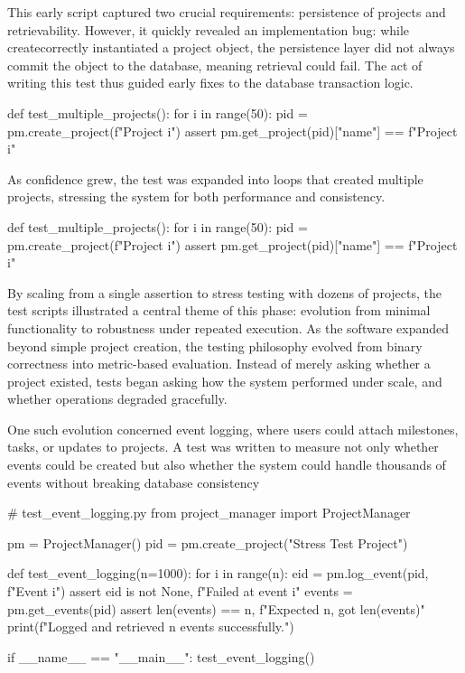 \documentclass{report}
\begin{document}
This early script captured two crucial requirements: persistence of projects and retrievability. 
However, it quickly revealed an implementation bug: while create\textunderscoreproject correctly instantiated a project object, the persistence layer did not always commit the object to the database, meaning retrieval could fail. 
The act of writing this test thus guided early fixes to the database transaction logic.

\begin{python}
    def test_multiple_projects():
    for i in range(50):
        pid = pm.create_project(f"Project {i}")
        assert pm.get_project(pid)["name"] == f"Project {i}"

\end{python} 

As confidence grew, the test was expanded into loops that created multiple projects, stressing the system for both performance and consistency.

\begin{python}
def test_multiple_projects():
    for i in range(50):
        pid = pm.create_project(f"Project {i}")
        assert pm.get_project(pid)["name"] == f"Project {i}"
\end{python}    

By scaling from a single assertion to stress testing with dozens of projects, the test scripts illustrated a central theme of this phase: evolution from minimal functionality to robustness under repeated execution.
As the software expanded beyond simple project creation, the testing philosophy evolved from binary correctness into metric-based evaluation. 
Instead of merely asking whether a project existed, tests began asking how the system performed under scale, and whether operations degraded gracefully.

One such evolution concerned event logging, where users could attach milestones, tasks, or updates to projects. 
A test was written to measure not only whether events could be created but also whether the system could handle thousands of events without breaking database consistency

\begin{python}
# test_event_logging.py
from project_manager import ProjectManager

pm = ProjectManager()
pid = pm.create_project("Stress Test Project")

def test_event_logging(n=1000):
    for i in range(n):
        eid = pm.log_event(pid, f"Event {i}")
        assert eid is not None, f"Failed at event {i}"
    events = pm.get_events(pid)
    assert len(events) == n, f"Expected {n}, got {len(events)}"
    print(f"Logged and retrieved {n} events successfully.")

if __name__ == "__main__":
    test_event_logging()
\end{python} 
\end{document}

